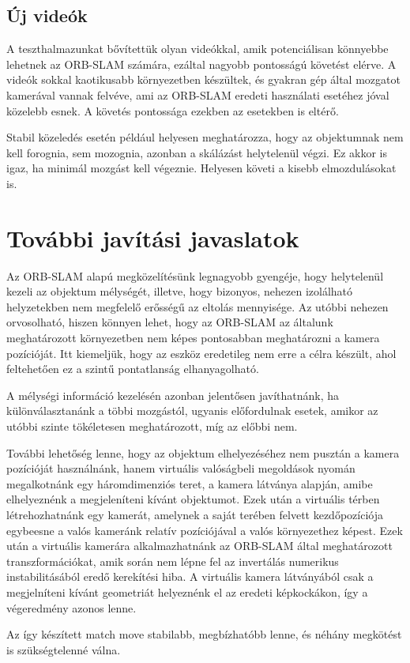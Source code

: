 \subsection{Új videók}

A teszthalmazunkat bővítettük olyan videókkal, amik potenciálisan könnyebbe lehetnek az ORB-SLAM számára, ezáltal nagyobb pontosságú követést elérve.
A videók sokkal kaotikusabb környezetben készültek, és gyakran gép által mozgatot kamerával vannak felvéve, ami az ORB-SLAM eredeti használati esetéhez jóval közelebb esnek.
A követés pontossága ezekben az esetekben is eltérő.

Stabil közeledés esetén például helyesen meghatározza, hogy az objektumnak nem kell forognia, sem mozognia, azonban a skálázást helytelenül végzi.
Ez akkor is igaz, ha minimál mozgást kell végeznie.
Helyesen követi a kisebb elmozdulásokat is.


\section{További javítási javaslatok}

Az ORB-SLAM alapú megközelítésünk legnagyobb gyengéje, hogy helytelenül kezeli az objektum mélységét, illetve, hogy bizonyos, nehezen izolálható helyzetekben nem megfelelő erősségű az eltolás mennyisége.
Az utóbbi nehezen orvosolható, hiszen könnyen lehet, hogy az ORB-SLAM az általunk meghatározott környezetben nem képes pontosabban meghatározni a kamera pozícióját.
Itt kiemeljük, hogy az eszköz eredetileg nem erre a célra készült, ahol feltehetően ez a szintű pontatlanság elhanyagolható.

A mélységi információ kezelésén azonban jelentősen javíthatnánk, ha különválasztanánk a többi mozgástól, ugyanis előfordulnak esetek, amikor az utóbbi szinte tökéletesen meghatározott, míg az előbbi nem.

További lehetőség lenne, hogy az objektum elhelyezéséhez nem pusztán a kamera pozícióját használnánk, hanem virtuális valóságbeli megoldások nyomán megalkotnánk egy háromdimenziós teret, a kamera látványa alapján, amibe elhelyeznénk a megjeleníteni kívánt objektumot.
Ezek után a virtuális térben létrehozhatnánk egy kamerát, amelynek a saját terében felvett kezdőpozíciója egybeesne a valós kameránk relatív pozíciójával a valós környezethez képest.
Ezek után a virtuális kamerára alkalmazhatnánk az ORB-SLAM által meghatározott transzformációkat, amik során nem lépne fel az invertálás numerikus instabilitásából eredő kerekítési hiba.
A virtuális kamera látványából csak a megjelníteni kívánt geometriát helyeznénk el az eredeti képkockákon, így a végeredmény azonos lenne.

Az így készített match move stabilabb, megbízhatóbb lenne, és néhány megkötést is szükségtelenné válna.
